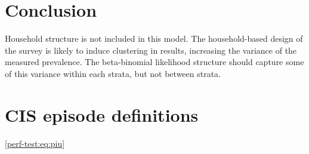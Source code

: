 \documentclass{cam-thesis}
\makeatletter
\DeclareRobustCommand\onedot{\futurelet\@let@token\@onedot}
\def\@onedot{\ifx\@let@token.\else.\null\fi\xspace}
\def\ie{i.e\onedot} \def\Ie{\emph{I.e}\onedot}
\DeclareMathOperator{\prob}{\mathbb{P}}
\makeatother
\begin{document}












\chapter{Conclusion}
Household structure is not included in this model.
The household-based design of the survey is likely to induce clustering in results, increasing the variance of the measured prevalence.
The beta-binomial likelihood structure should capture some of this variance within each strata, but not between strata.

\listoftodos

\printbibliography

\appendix



\chapter{CIS episode definitions} \label{episode-def}




\cref{perf-test:eq:piu}
\end{document}
